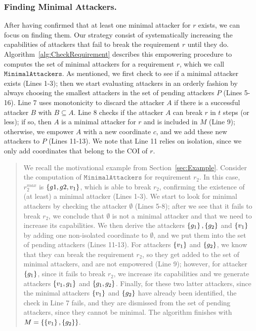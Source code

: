 {\subsubsection{Finding Minimal Attackers.} 
After having confirmed that at least one minimal attacker for $r$ exists, we can focus on finding them. Our strategy consist of systematically increasing the capabilities of attackers that fail to break the requirement $r$ until they do. Algorithm~\ref{alg:CheckRequirement} describes this empowering procedure to computes the set of minimal attackers for a requirement $r$, which we call $\mathtt{MinimalAttackers}$. As mentioned, we first check to see if a minimal attacker exists (Lines 1-3); then we start evaluating attackers in an orderly fashion by always choosing the smallest attackers in the set of pending attackers $P$ (Lines 5-16). Line 7 uses monotonicity to discard the attacker $A$ if there is a successful attacker $B$ with $B\subseteq A$. Line 8 checks if the attacker $A$ can break $r$ in $t$ steps (or less); if so, then $A$ is a minimal attacker for $r$ and is included in $M$ (Line 9); otherwise, we empower $A$ with a new coordinate $c$, and we add these new attackers to $P$ (Lines 11-13). We note that Line 11 relies on isolation, since we only add coordinates that belong to the COI of $r$.

\begin{quote}
We recall the motivational example from Section~\ref{sec:Example}. Consider the computation of $\mathtt{MinimalAttackers}$ for requirement $r_2$. In this case, $r_2^{max}$ is $\left\{g1,g2,v_1\right\}$, which is able to break $r_2$, confirming the existence of (at least) a minimal attacker (Lines 1-3). We start to look for minimal attackers by checking the attacker $\emptyset$ (Lines 5-8); after we see that it fails to break $r_2$, we conclude that $\emptyset$ is not a minimal attacker and that we need to increase its capabilities. We then derive the attackers $\left\{g_1\right\}, \left\{g_2\right\}$ and $\left\{v_1\right\}$ by adding one non-isolated coordinate to $\emptyset$, and we put them into the set of pending attackers (Lines 11-13). For attackers $\left\{v_1\right\}$ and $\left\{g_2\right\}$, we know that they can break the requirement $r_2$, so they get added to the set of minimal attackers, and are not empowered (Line 9); however, for attacker $\left\{g_1\right\}$, since it fails to break $r_2$, we increase its capabilities and we generate attackers $\left\{v_1, g_1\right\}$ and $\left\{g_1, g_2\right\}$. Finally, for these two latter attackers, since the minimal attackers $\left\{v_1\right\}$ and $\left\{g_2\right\}$ have already been identified, the check in Line 7 fails, and they are dismissed from the set of pending attackers, since they cannot be minimal. The algorithm finishes with $M=\left\{\left\{v_1\right\}, \left\{g_2\right\}\right\}$.
\end{quote}


}
